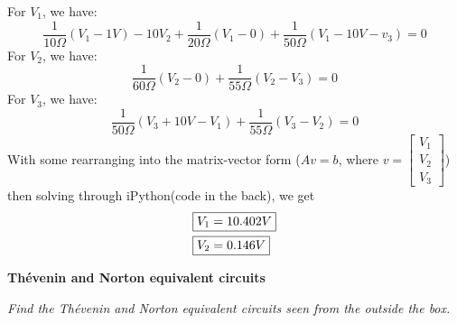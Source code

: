\documentclass[letter]{article}
\newenvironment{menumerate}{%
  \edef\backupindent{\the\parindent}%
  \enumerate%
  \setlength{\parindent}{\backupindent}%
}{\endenumerate}
\begin{document}
\begin{menumerate}
\begin{menumerate}
        For $V_1$, we have:
        \begin{equation}
            \frac{1}{10\Omega}(V_1 - 1V) - 10V_2 + \frac{1}{20\Omega}(V_1 - 0) + \frac{1}{50\Omega}(V_1 - 10V - v_3) = 0
        \end{equation}
        For $V_2$, we have:
        \begin{equation}
            \frac{1}{60\Omega}(V_2 - 0) + \frac{1}{55\Omega}(V_2 - V_3) = 0
        \end{equation}
        For $V_3$, we have:
        \begin{equation}
            \frac{1}{50\Omega}(V_3 + 10V - V_1) + \frac{1}{55\Omega}(V_3 - V_2) = 0
        \end{equation}
        With some rearranging into the matrix-vector form ($Av = b$, where $v = \begin{bmatrix}
                V_1\\ V_2\\ V_3
            \end{bmatrix}$) then solving through iPython(code in the back), we get
        \begin{align}
            \Aboxed{V_1 &= 10.402V} \\
            \Aboxed{V_2 &= 0.146V}
        \end{align}
    \end{menumerate}

    \item \textbf{Thévenin and Norton equivalent circuits}
    \begin{menumerate}
        \item \emph{Find the Thévenin and Norton equivalent circuits seen from the outside the box.}


\end{menumerate}
\end{menumerate}
\end{document}
